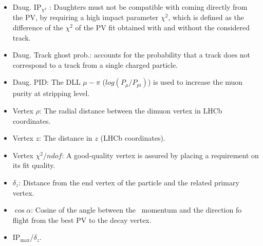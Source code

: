 \begin{itemize}
 \item Daug. IP$_{\chi^{2}}$ : Daughters must not be compatible with coming directly from the PV, by requiring a high impact parameter $\chi^{2}$, which is defined as the difference of the $\chi^{2}$ of the PV
       fit obtained with and without the considered track.
 \item Daug. Track ghost prob.:  accounts for the probability that a track does not correspond to a track from a single charged particle.
 \item Daug. PID: The DLL $\mu-\pi$ ($log(P_{\mu}/P_{pi})$) is used to increase the muon purity at stripping level.
 \item Vertex $\rho$: The radial distance between the dimuon vertex in LHCb coordinates.
 \item Vertex $z$: The distance in $z$ (LHCb coordinates).
 \item Vertex $\chi^{2}/ndof$: A good-quality vertex is assured by placing a requirement on its fit quality.
 \item $\delta_{z}$: Distance from the end vertex of the particle and the related primary vertex.
 \item $\cos\alpha$: Cosine of the angle between the \KS\ momentum and the direction fo flight from the best PV to the decay vertex.
 \item IP$_{\text{max}}$/$\delta_{z}$.
\end{itemize}

